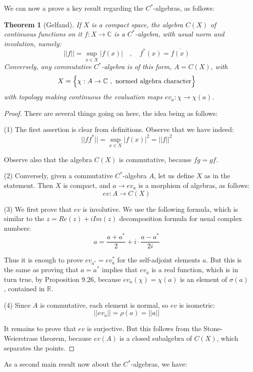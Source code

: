 \documentclass[12pt]{amsbook}
\newtheorem{theorem}{Theorem}[chapter]
\begin{document}
We can now a prove a key result regarding the $C^*$-algebras, as follows:

\begin{theorem}[Gelfand]
If $X$ is a compact space,  the algebra $C(X)$ of continuous functions on it $f:X\to\mathbb C$ is a $C^*$-algebra, with usual norm and involution, namely:
$$||f||=\sup_{x\in X}|f(x)|\quad,\quad 
f^*(x)=\overline{f(x)}$$
Conversely, any commutative $C^*$-algebra is of this form, $A=C(X)$, with 
$$X=\Big\{\chi:A\to\mathbb C\ ,\ {\rm normed\ algebra\ character}\Big\}$$
with topology making continuous the evaluation maps $ev_a:\chi\to\chi(a)$.
\end{theorem}

\begin{proof}
There are several things going on here, the idea being as follows:

\medskip

(1) The first assertion is clear from definitions. Observe that we have indeed:
$$||ff^*||
=\sup_{x\in X}|f(x)|^2
=||f||^2$$

Observe also that the algebra $C(X)$ is commutative, because $fg=gf$.

\medskip

(2) Conversely, given a commutative $C^*$-algebra $A$, let us define $X$ as in the statement. Then $X$ is compact, and $a\to ev_a$ is a morphism of algebras, as follows:
$$ev:A\to C(X)$$

(3) We first prove that $ev$ is involutive. We use the following formula, which is similar to the $z=Re(z)+iIm(z)$ decomposition formula for usual complex numbers:
$$a=\frac{a+a^*}{2}+i\cdot\frac{a-a^*}{2i}$$

Thus it is enough to prove $ev_{a^*}=ev_a^*$ for the self-adjoint elements $a$. But this is the same as proving that $a=a^*$ implies that $ev_a$ is a real function, which is in turn true, by Proposition 9.26, because $ev_a(\chi)=\chi(a)$ is an element of $\sigma(a)$, contained in $\mathbb R$.

\medskip

(4) Since $A$ is commutative, each element is normal, so $ev$ is isometric:
$$||ev_a||
=\rho(a)
=||a||$$

It remains to prove that $ev$ is surjective. But this follows from the Stone-Weierstrass theorem, because $ev(A)$ is a closed subalgebra of $C(X)$, which separates the points.
\end{proof}

As a second main result now about the $C^*$-algebras, we have:
\end{document}
